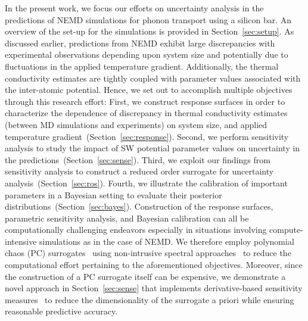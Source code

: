 In the present work, we focus our efforts on uncertainty analysis in the predictions of NEMD simulations
for phonon transport using a silicon bar. An overview of the set-up for the simulations is
provided in Section~\ref{sec:setup}. As discussed earlier, predictions from NEMD
exhibit large discrepancies with experimental observations depending upon system size and potentially
due to fluctuations in the applied temperature gradient. Additionally, the thermal conductivity estimates are
tightly coupled with parameter values associated with the inter-atomic potential. Hence, we set out to
accomplish multiple objectives through this research effort: First, we construct response surfaces
in order to characterize the dependence of discrepancy in thermal conductivity estimates (between
MD simulations and experiments) on system size, and applied temperature gradient~(Section~\ref{sec:response}).
Second, we perform sensitivity analysis to study the impact of SW potential parameter values on 
uncertainty in the predictions~(Section~\ref{sec:sense}).
Third, we exploit our findings from sensitivity analysis to 
construct a reduced order surrogate for uncertainty analysis~(Section~\ref{sec:ros}). 
Fourth, we illustrate the calibration
of important parameters in a Bayesian setting to evaluate their posterior
distributions~(Section~\ref{sec:bayes}). Construction of the
response surfaces, parametric sensitivity analysis, and Bayesian calibration can all be computationally
challenging endeavors especially in situations involving compute-intensive simulations as in the
case of NEMD. We therefore employ polynomial chaos (PC) surrogates~\cite{Xiu:2002,Ghanem:1990}
using non-intrusive spectral approaches~\cite{Olivier:2010} to reduce the computational effort pertaining
to the aforementioned objectives. Moreover, since the construction of a PC surrogate itself can be
expensive, we demonstrate a novel approach in Section~\ref{sec:sense} that implements derivative-based
sensitivity measures~\cite{Sobol:2010} to reduce the dimensionality of the surrogate a priori while
ensuring reasonable predictive accuracy. 
